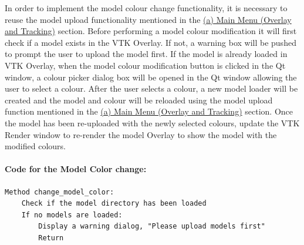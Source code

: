 \documentclass[12pt]{article}
\begin{document}
\begin{enumerate}
\begin{enumerate}
                  In order to implement the model colour change functionality, it is necessary to reuse the model upload functionality mentioned in the \hyperref[sec:upload]{(a) Main Menu (Overlay and Tracking)} section. Before performing a model colour modification it will first check if a model exists in the VTK Overlay. If not, a warning box will be pushed to prompt the user to upload the model first. If the model is already loaded in VTK Overlay, when the model colour modification button is clicked in the Qt window, a colour picker dialog box will be opened in the Qt window allowing the user to select a colour. After the user selects a colour, a new model loader will be created and the model and colour will be reloaded using the model upload function mentioned in the \hyperref[sec:upload]{(a) Main Menu (Overlay and Tracking)} section. Once the model has been re-uploaded with the newly selected colours, update the VTK Render window to re-render the model Overlay to show the model with the modified colours.
                  \paragraph{Code for the Model Color change:}
                  \begin{verbatim}
Method change_model_color:
    Check if the model directory has been loaded
    If no models are loaded:
        Display a warning dialog, "Please upload models first"
        Return


\end{verbatim}
\end{enumerate}
\end{enumerate}
\end{document}
